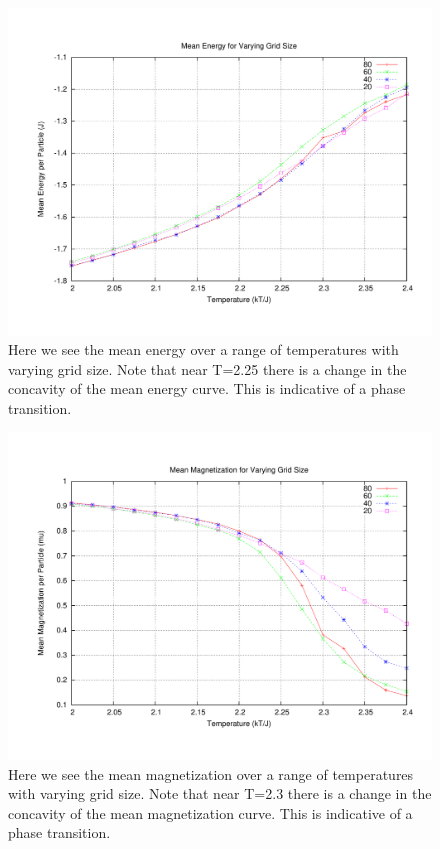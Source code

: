 \documentclass[11pt,a4paper]{article}
\begin{document}
\begin{figure}
\centering
\includegraphics[width=1.0\textwidth]{meanenergy.pdf}
\caption{Here we see the mean energy over a range of temperatures with varying grid size. Note that near T=2.25 there is a change in the concavity of the mean energy curve. This is indicative of a phase transition.}
\end{figure}
\begin{figure}
\centering
\includegraphics[width=1.0\textwidth]{meanmag.pdf}
\caption{Here we see the mean magnetization over a range of temperatures with varying grid size. Note that near T=2.3 there is a change in the concavity of the mean magnetization curve. This is indicative of a phase transition.}
\end{figure}
\end{document}
